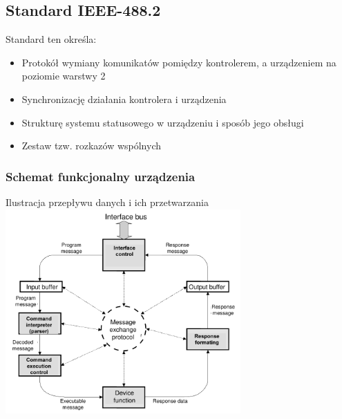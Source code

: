 \subsection{Standard IEEE-488.2}
Standard ten określa:
\begin{itemize}
	\item Protokół wymiany komunikatów pomiędzy kontrolerem, a urządzeniem na poziomie warstwy 2
	\item Synchronizację działania kontrolera i urządzenia
	\item Strukturę systemu statusowego w urządzeniu i sposób jego obsługi
	\item Zestaw tzw. rozkazów wspólnych
\end{itemize}

\subsubsection{Schemat funkcjonalny urządzenia}
Ilustracja przepływu danych i ich przetwarzania\\
\includegraphics[width=9cm]{./wyklady/IEEE488_SCPI_19_1.pdf}

